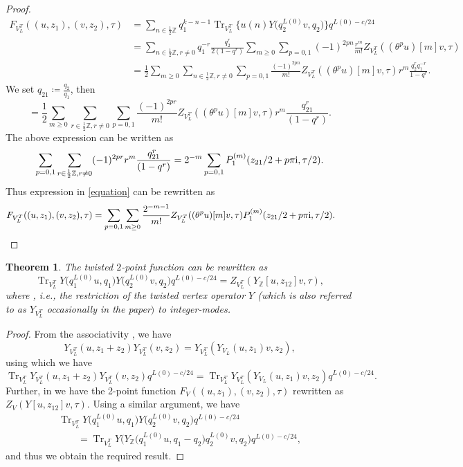 \documentclass[pdftex]{sigma}
\numberwithin{equation}{section}
\newtheorem{Theorem}{Theorem}[section]
\theoremstyle{definition}
\begin{document}
\begin{proof}
\begin{align*}
F_{V_L^T}((u,z_1),(v,z_2),\tau)&= \sum_{n\in \frac{1}{2}\mathbb{Z}}q_1^{k-n-1}\operatorname{Tr}_{V_L^T}\bigl\{u(n)Y\bigl(q_2^{L(0)}v,q_2\bigr)\bigr\}q^{L(0)-c/24}
\\
&= \sum_{n \in \frac{1}{2}\mathbb{Z}, r \neq 0} q_1^{-r} \frac{q_2^r}{2(1-q^r)} \sum_{m \geq 0} \sum_{p=0,1} (-1)^{2pn} \frac{r^m}{m!} Z_{V_L^T}((\theta^p u)[m]v, \tau)
\\
&= \frac{1}{2} \sum_{m \geq 0} \sum_{n \in \frac{1}{2} \mathbb{Z}, r \neq 0} \sum_{p=0,1} \frac{(-1)^{2pn}}{m!} Z_{V_L^T} ((\theta^p u)[m]v, \tau) r^m \frac{q_2^r q_1^{-r}}{1-q^r}.
\end{align*}
We set $q_{21}\coloneqq\frac{q_2}{q_1}$, then
\begin{equation}\label{equation}
 =\frac{1}{2}\sum_{m\geq 0}\sum_{r\in\frac{1}{2}\mathbb{Z},r\neq 0}\sum_{p=0,1}\frac{(-1)^{2pr}}{m!}Z_{V_L^T}((\theta^pu)[m]v, \tau)r^m\frac{q_{21}^r}{(1-q^r)}.
\end{equation}
The above expression can be written as
\[\sum_{p=0,1}\sum_{r\in\frac{1}{2}\mathbb{Z},r\neq 0}(-1)^{2pr}r^m\frac{q_{21}^r}{(1-q^r)}=2^{-m}\sum_{p=0,1}P_1^{(m)}(z_{21}/2+p\pi {\rm i},\tau/2).\]
Thus expression in \eqref{equation} can be rewritten as
\[F_{V_L^T}((u,z_1),(v,z_2),\tau)=\sum_{p=0,1}\sum_{m\geq 0}\frac{2^{-m-1}}{m!}Z_{V_L^T}((\theta^pu)[m]v, \tau)P_1^{(m)}(z_{21}/2+p\pi {\rm i},\tau/2).\tag*{\qed}
\] \renewcommand{\qed}{}
\end{proof}

\begin{Theorem}\label{Reduction Theorem 2}
 The twisted $2$-point function can be rewritten as
 \[\operatorname{Tr}_{V_L^T}Y\bigl(q_1^{L(0)}u,q_1\bigr)Y\bigl(q_2^{L(0)}v,q_2\bigr)q^{L(0)-c/24}=Z_{V_L^T}(Y_{\mathbb{Z}}[u,z_{12}]v,\tau),\]
 where , i.e., the restriction of the twisted vertex operator $Y$ {\rm(}which is also referred to as $Y_{V_L^T}$ occasionally in the paper$)$ to integer-modes.
\end{Theorem}

\begin{proof}
 From the associativity \cite[formula~(9.3.52)]{Frenkel1988VertexMonster}, we have
 \[Y_{V_L^T}(u,z_1+z_2)Y_{V_L^T}(v,z_2)=Y_{V_L^T}(Y_{V_L}(u,z_1)v,z_2),\]
 using which we have
 \[\operatorname{Tr}_{V_L^T}Y_{V_L^T}(u,z_1+z_2)Y_{V_L^T}(v,z_2)q^{L(0)-c/24}=\operatorname{Tr}_{V_L^T}Y_{V_L^T}(Y_{V_L}(u,z_1)v,z_2)q^{L(0)-c/24}.\]
 Further, in \cite[Theorem 10]{Mason20231-PointAlgebras} we have the 2-point function $F_V((u,z_1),(v,z_2),\tau)$ rewritten as $Z_V(Y[u,z_{12}]v,\tau)$. Using a similar argument, we have
 \begin{gather*}\operatorname{Tr}_{V_L^T}Y\bigl(q_1^{L(0)}u,q_1\bigr)Y\bigl(q_2^{L(0)}v,q_2\bigr)q^{L(0)-c/24}\\
 \qquad
 =\operatorname{Tr}_{V_L^T}Y\bigl(Y_{\mathbb{Z}}\bigl(q_1^{L(0)}u,q_1-q_2\bigr)q_2^{L(0)}v,q_2\bigr)q^{L(0)-c/24},\end{gather*}
 and thus we obtain the required result.
\end{proof}
\end{document}
